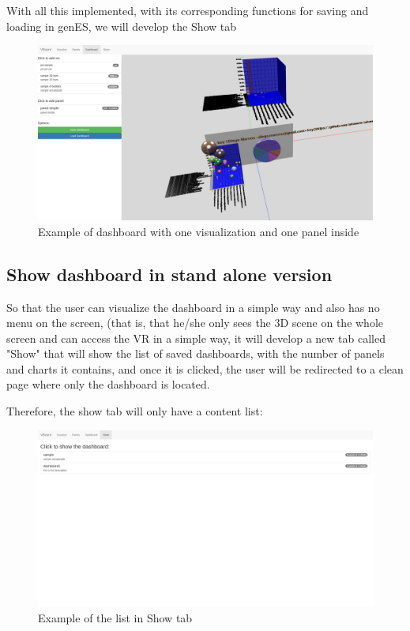 \documentclass[a4paper, 12pt]{book}
\begin{document}
With all this implemented, with its corresponding functions for saving and loading in genES, we will develop the Show tab

\begin{figure}[H]
  \centering
  \includegraphics[width=16cm, keepaspectratio]{img/development/exampledashboard}
  \caption{Example of dashboard with one visualization and one panel inside}
  \label{fig:exampledashboard}
\end{figure}

\subsection{Show dashboard in stand alone version}

So that the user can visualize the dashboard in a simple way and also has no menu on the screen, (that is, that he/she only sees the 3D scene on the whole screen and can access the VR in a simple way, it will develop a new tab called "Show" that will show the list of saved dashboards, with the number of panels and charts it contains, and once it is clicked, the user will be redirected to a clean page where only the dashboard is located.

Therefore, the show tab will only have a content list:

\begin{figure}[H]
  \centering
  \includegraphics[width=16cm, keepaspectratio]{img/development/exampleshow}
  \caption{Example of the list in Show tab}
  \label{fig:exampleshow}
\end{figure}
\end{document}
